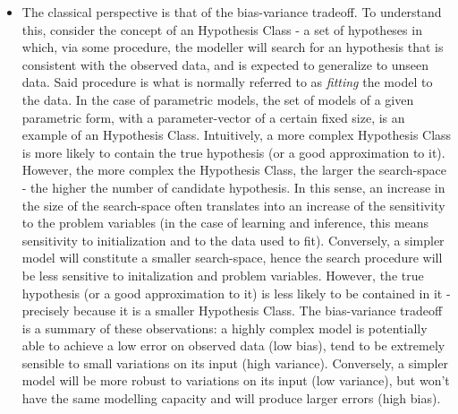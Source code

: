 \begin{itemize}
    \item The classical perspective is that of the bias-variance tradeoff. To
        understand this, consider the concept of an Hypothesis Class - a set
        of hypotheses in which, via some procedure, the modeller will search
        for an hypothesis that is consistent with the observed data, and is
        expected to generalize to unseen data. Said procedure is what is normally
        referred to as \emph{fitting} the model to the data. In the case of
        parametric models, the set of models of a given parametric form, with
        a parameter-vector of a certain fixed size, is an example of an Hypothesis
        Class. Intuitively, a more complex Hypothesis Class is more likely to
        contain the true hypothesis (or a good approximation to it). However,
        the more complex the Hypothesis Class, the larger the search-space -
        the higher the number of candidate hypothesis. In this sense, an increase
        in the size of the search-space often translates into an increase of the
        sensitivity to the problem variables (in the case of learning and inference,
        this means sensitivity to initialization and to the data used to fit).
        Conversely, a simpler model will constitute a smaller search-space, hence
        the search procedure will be less sensitive to initalization and problem
        variables. However, the true hypothesis (or a good approximation to it)
        is less likely to be contained in it - precisely because it is a smaller
        Hypothesis Class. The bias-variance tradeoff is a summary of these observations:
        a highly complex model is potentially able to achieve a low error on observed
        data (low bias), tend to be extremely sensible to small variations on its
        input (high variance). Conversely, a simpler model will be more robust
        to variations on its input (low variance), but won't have the same
        modelling capacity and will produce larger errors (high bias). %

\end{itemize}
